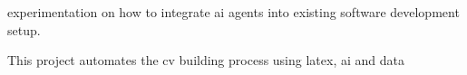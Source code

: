 experimentation on how to integrate ai agents into existing software development setup.

    
\divider

This project automates the cv building process using latex, ai and data
  
